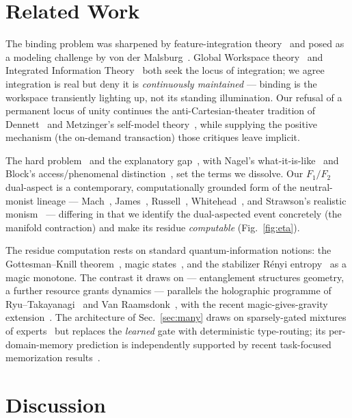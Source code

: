 \documentclass[11pt]{article}
\begin{document}
\section{Related Work}

The binding problem was sharpened by feature-integration theory~\cite{treisman1980} and posed as a
modeling challenge by von der Malsburg~\cite{malsburg1999}. Global Workspace
theory~\cite{baars1988,dehaene1998} and Integrated Information Theory~\cite{tononi2004} both seek the
locus of integration; we agree integration is real but deny it is \emph{continuously maintained} ---
binding is the workspace transiently lighting up, not its standing illumination. Our refusal of a
permanent locus of unity continues the anti-Cartesian-theater tradition of Dennett~\cite{dennett1991}
and Metzinger's self-model theory~\cite{metzinger2003}, while supplying the positive mechanism (the
on-demand transaction) those critiques leave implicit.

The hard problem~\cite{chalmers1995,chalmers1996} and the explanatory gap~\cite{levine1983}, with
Nagel's what-it-is-like~\cite{nagel1974} and Block's access/phenomenal distinction~\cite{block1995},
set the terms we dissolve. Our $F_1/F_2$ dual-aspect is a contemporary, computationally grounded form
of the neutral-monist lineage --- Mach~\cite{mach1886}, James~\cite{james1904},
Russell~\cite{russell1927}, Whitehead~\cite{whitehead1929}, and Strawson's realistic
monism~\cite{strawson2006} --- differing in that we identify the dual-aspected event concretely (the
manifold contraction) and make its residue \emph{computable} (Fig.~\ref{fig:eta}).

The residue computation rests on standard quantum-information notions: the Gottesman--Knill
theorem~\cite{gottesman1998}, magic states~\cite{bravyi2005}, and the stabilizer R\'enyi
entropy~\cite{leone2022} as a magic monotone. The contrast it draws on --- entanglement structures
geometry, a further resource grants dynamics --- parallels the holographic programme of
Ryu--Takayanagi~\cite{ryu2006} and Van Raamsdonk~\cite{vanraamsdonk2010}, with the recent
magic-gives-gravity extension~\cite{quanta2026}. The architecture of Sec.~\ref{sec:many} draws on
sparsely-gated mixtures of experts~\cite{shazeer2017} but replaces the \emph{learned} gate with
deterministic type-routing; its per-domain-memory prediction is independently supported by recent
task-focused memorization results~\cite{taskmem2026}.

\section{Discussion}
\end{document}
